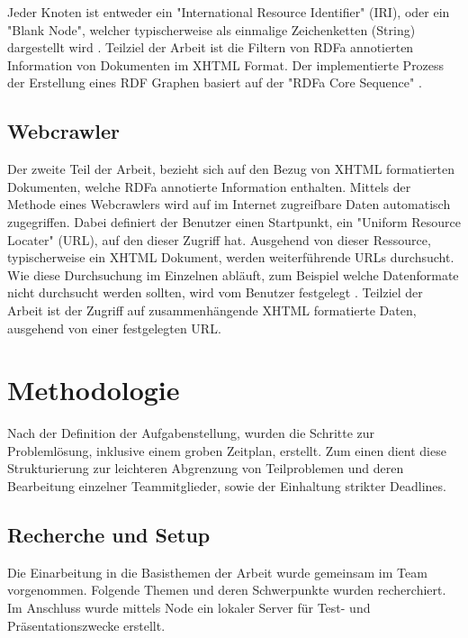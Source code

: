 \documentclass[hidelinks, a4paper, 11pt]{article} %
\begin{document}
Jeder Knoten ist entweder ein "International Resource Identifier" (IRI), oder ein "Blank Node", welcher typischerweise als einmalige Zeichenketten (String) dargestellt wird \cite{adida2008rdfa}. Teilziel der Arbeit ist die Filtern von RDFa annotierten Information von Dokumenten im XHTML Format. Der implementierte Prozess der Erstellung eines RDF Graphen basiert auf der "RDFa Core Sequence" \cite{rdfaSequence}.

\subsection{Webcrawler}

Der zweite Teil der Arbeit, bezieht sich auf den Bezug von XHTML formatierten Dokumenten, welche RDFa annotierte Information enthalten. Mittels der Methode eines Webcrawlers wird auf im Internet zugreifbare Daten automatisch zugegriffen. Dabei definiert der Benutzer einen Startpunkt, ein "Uniform Resource Locater" (URL), auf den dieser Zugriff hat. Ausgehend von dieser Ressource, typischerweise ein XHTML Dokument, werden weiterf\"uhrende URLs durchsucht. Wie diese Durchsuchung im Einzelnen abl\"auft, zum Beispiel welche Datenformate nicht durchsucht werden sollten, wird vom Benutzer festgelegt \cite{pinkerton2000webcrawler}. 
Teilziel der Arbeit ist der Zugriff auf zusammenh\"angende XHTML formatierte Daten, ausgehend von einer festgelegten URL.



\section{Methodologie}

Nach der Definition der Aufgabenstellung, wurden die Schritte zur Probleml\"osung, inklusive einem groben Zeitplan, erstellt. Zum einen dient diese Strukturierung zur leichteren Abgrenzung von Teilproblemen und deren Bearbeitung einzelner Teammitglieder, sowie der Einhaltung strikter Deadlines.

\subsection{Recherche und Setup}

Die Einarbeitung in die Basisthemen der Arbeit wurde gemeinsam im Team vorgenommen. Folgende Themen und deren Schwerpunkte wurden recherchiert. Im Anschluss wurde mittels Node ein lokaler Server f\"ur Test- und Pr\"asentationszwecke erstellt.
\end{document}
